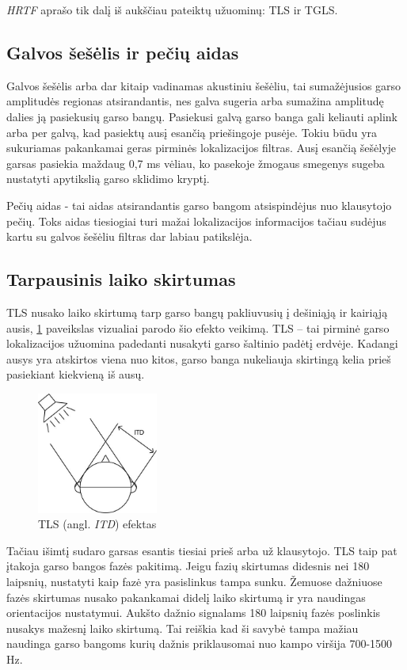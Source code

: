 \documentclass[]{vgtuef}
\begin{document}
\textit{HRTF} aprašo tik dalį iš aukščiau pateiktų užuominų: TLS ir TGLS.


\subsection{Galvos šešėlis ir pečių aidas}

Galvos šešėlis arba dar kitaip vadinamas akustiniu šešėliu, tai sumažėjusios garso amplitudės regionas atsirandantis, nes galva sugeria arba sumažina amplitudę dalies ją pasiekusių garso bangų. Pasiekusi galvą garso banga gali keliauti aplink arba per galvą, kad pasiektų ausį esančią priešingoje pusėje. Tokiu būdu yra sukuriamas pakankamai geras pirminės lokalizacijos filtras. Ausį esančią šešėlyje garsas pasiekia maždaug 0,7 ms vėliau, ko pasekoje žmogaus smegenys sugeba nustatyti apytikslią garso sklidimo kryptį. 

Pečių aidas - tai aidas atsirandantis garso bangom atsispindėjus nuo klausytojo pečių. Toks aidas tiesiogiai turi mažai lokalizacijos informacijos tačiau sudėjus kartu su galvos šešėliu filtras dar labiau patikslėja.


\subsection{Tarpausinis laiko skirtumas}

TLS nusako laiko skirtumą tarp garso bangų pakliuvusių į dešiniąją ir kairiąją ausis, \ref{fig:ITD_1} paveikslas vizualiai parodo šio efekto veikimą. TLS – tai pirminė garso lokalizacijos užuomina padedanti nusakyti garso šaltinio padėtį erdvėje. Kadangi ausys yra atskirtos viena nuo kitos, garso banga nukeliauja skirtingą kelia prieš pasiekiant kiekvieną iš ausų.

\begin{figure}[!ht]
  \centering
  \includegraphics[width=150px]{img/ITD.jpg}
  \caption{TLS (angl. \textit{ITD}) efektas}
  \label{fig:ITD_1}
\end{figure}

Tačiau išimtį sudaro garsas esantis tiesiai prieš arba už klausytojo. TLS taip pat įtakoja garso bangos fazės  pakitimą. Jeigu fazių skirtumas didesnis nei 180 laipsnių, nustatyti kaip fazė yra pasislinkus tampa sunku. Žemuose dažniuose fazės skirtumas nusako pakankamai didelį laiko skirtumą ir yra naudingas orientacijos nustatymui. Aukšto dažnio signalams 180 laipsnių fazės poslinkis  nusakys mažesnį laiko skirtumą. Tai reiškia kad ši savybė tampa mažiau naudinga garso bangoms kurių dažnis priklausomai nuo kampo viršija 700-1500 Hz.
\end{document}
